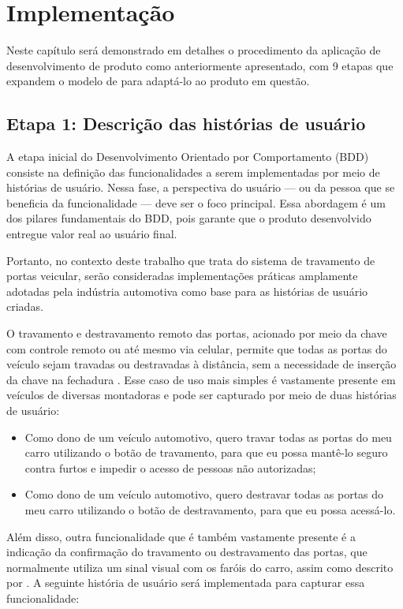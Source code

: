 \chapter{Implementação} 
\label{ch:IM}

Neste capítulo será demonstrado em detalhes o procedimento da aplicação de desenvolvimento de produto como anteriormente apresentado, 
com 9 etapas que expandem o modelo de  para adaptá-lo ao produto em questão.

\section{\textbf{Etapa 1: Descrição das histórias de usuário}}
A etapa inicial do Desenvolvimento Orientado por Comportamento (BDD) consiste na definição das funcionalidades a serem implementadas por meio de histórias de usuário. 
Nessa fase, a perspectiva do usuário — ou da pessoa que se beneficia da funcionalidade — deve ser o foco principal. Essa abordagem é um dos pilares fundamentais do BDD, 
pois garante que o produto desenvolvido entregue valor real ao usuário final.

Portanto, no contexto deste trabalho que trata do sistema de travamento de portas veicular, serão consideradas implementações práticas amplamente adotadas pela 
indústria automotiva como base para as histórias de usuário criadas.

O travamento e destravamento remoto das portas, acionado por meio da chave com controle remoto ou até mesmo via celular, permite que todas as portas do veículo sejam 
travadas ou destravadas à distância, sem a necessidade de inserção da chave na fechadura \cite{bosch2022handbook}. Esse caso de uso mais simples é vastamente presente 
em veículos de diversas montadoras e pode ser capturado por meio de duas histórias de usuário:

\begin{itemize}
    \item Como dono de um veículo automotivo, quero travar todas as portas do meu carro utilizando o botão de travamento, para que eu possa mantê-lo seguro contra furtos e impedir o acesso de pessoas não autorizadas;
    \item Como dono de um veículo automotivo, quero destravar todas as portas do meu carro utilizando o botão de destravamento, para que eu possa acessá-lo.
\end{itemize}

Além disso, outra funcionalidade que é também vastamente presente é a indicação da confirmação do travamento ou destravamento das portas, que normalmente utiliza um 
sinal visual com os faróis do carro, assim como descrito por . A seguinte história de usuário será implementada para capturar essa funcionalidade:


